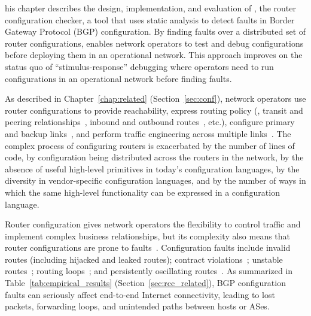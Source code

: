 
his chapter describes the design, implementation, and evaluation of
\textbf{\rccns},
the router configuration checker, a tool
that uses static analysis to detect faults in Border Gateway Protocol
(BGP) 
configuration.  
By finding faults over a
distributed set of router configurations, \rcc enables network
operators to test and debug configurations before deploying them in an
operational network. This approach improves on the status quo of
``stimulus-response'' debugging where operators need to run
configurations in an operational network before finding faults.

As described in Chapter~\ref{chap:related} (Section~\ref{sec:conf}),
network operators use router configurations to provide reachability,
express routing policy (\eg, transit and peering
relationships~\cite{Norton2000}, inbound and outbound
routes~\cite{Beijnum2002}, etc.), configure primary and backup
links~\cite{Gao2001b}, and perform traffic engineering across multiple
links~\cite{Feamster2004}.  The complex process of configuring routers
is exacerbated by the number of lines of code, by configuration being
distributed across the routers in the network, by the absence of useful
high-level primitives in today's configuration languages, by the
diversity in vendor-specific configuration languages, and by the number
of ways in which the same high-level functionality can be expressed in a
configuration language.  

Router configuration gives network operators the flexibility to control
traffic and implement complex business relationships, but its complexity
also means that router configurations are prone to
faults~\cite{Beijnum2002,Mahajan2002}.  Configuration faults include
invalid routes (including hijacked and leaked routes); contract
violations~\cite{Feamster2004b}; unstable routes~\cite{labovitz:ton01};
routing loops~\cite{Dube99,Feamster2003b}; and persistently oscillating
routes~\cite{Basu2002,Griffin99,Varadhan2000}.
As summarized in
Table~\ref{tab:empirical_results} (Section~\ref{sec:rcc_related}), BGP
configuration faults can seriously affect end-to-end Internet
connectivity, leading to lost packets, forwarding loops, and unintended
paths between hosts or ASes.  


